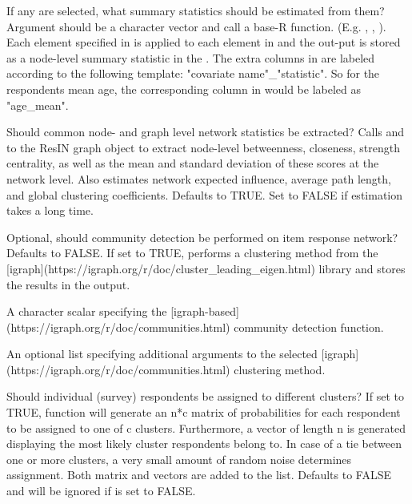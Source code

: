 \documentclass[a4paper]{book}
\begin{document}
\begin{Arguments}
\begin{ldescription}
\item[\code{node\_costats}] If any  are selected, what summary statistics should be estimated from them? Argument should be a character vector and call a base-R function. (E.g. , , ). Each element specified in  is applied to each element in  and the out-put is stored as a node-level summary statistic in the . The extra columns in  are labeled according to the following template: "covariate name"\_"statistic". So for the respondents mean age, the corresponding column in  would be labeled as "age\_mean".

\item[\code{network\_stats}] Should common node- and graph level network statistics be extracted? Calls  and  to the ResIN graph object to extract node-level betweenness, closeness, strength centrality, as well as the mean and standard deviation of these scores at the network level. Also estimates network expected influence, average path length, and global clustering coefficients. Defaults to TRUE. Set to FALSE if estimation takes a long time.

\item[\code{detect\_clusters}] Optional, should community detection be performed on item response network? Defaults to FALSE. If set to TRUE, performs a clustering method from the [igraph](https://igraph.org/r/doc/cluster\_leading\_eigen.html) library and stores the results in the  output.

\item[\code{cluster\_method}] A character scalar specifying the [igraph-based](https://igraph.org/r/doc/communities.html) community detection function.

\item[\code{cluster\_arglist}] An optional list specifying additional arguments to the selected [igraph](https://igraph.org/r/doc/communities.html) clustering method.

\item[\code{cluster\_assignment}] Should individual (survey) respondents be assigned to different clusters? If set to TRUE, function will generate an n*c matrix of probabilities for each respondent to be assigned to one of c clusters. Furthermore, a vector of length n is generated displaying the most likely cluster respondents belong to. In case of a tie between one or more clusters, a very small amount of random noise determines assignment. Both matrix and vectors are added to the  list. Defaults to FALSE and will be ignored if  is set to FALSE.


\end{ldescription}
\end{Arguments}
\end{document}
